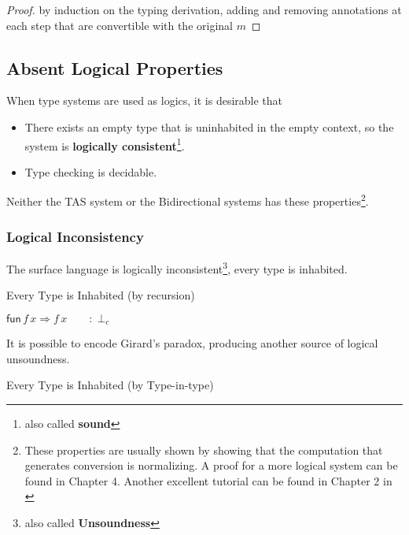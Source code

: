 \begin{proof}
by induction on the typing derivation, adding and removing annotations at each step that are convertible with the original $m$
\end{proof}

\subsection{Absent Logical Properties}

When type systems are used as logics, it is desirable that
\begin{itemize}
\item There exists an empty type that is uninhabited in the empty context, so the system is \textbf{logically consistent}\footnote{also called \textbf{sound}}.
\item Type checking is decidable.
\end{itemize}
Neither the TAS system or the Bidirectional systems has these properties\footnote{These properties are usually shown by showing that the computation that generates conversion is normalizing.
A proof for a more logical system can be found in Chapter 4\cite{luo1994computation}.
Another excellent tutorial can be found in Chapter 2 in \cite{casinghino2014combiningthesis}}.

\subsubsection{Logical Inconsistency}

The surface language is logically inconsistent\footnote{also called \textbf{Unsoundness}}, every type is inhabited.



\begin{example}
Every Type is Inhabited (by recursion)

$\mathsf{fun}\,f\,x\Rightarrow f\,x\qquad:\perp_{c}$
\end{example}

It is possible to encode Girard's paradox, producing another source of logical unsoundness.
\begin{example}
Every Type is Inhabited (by Type-in-type)


\end{example}

